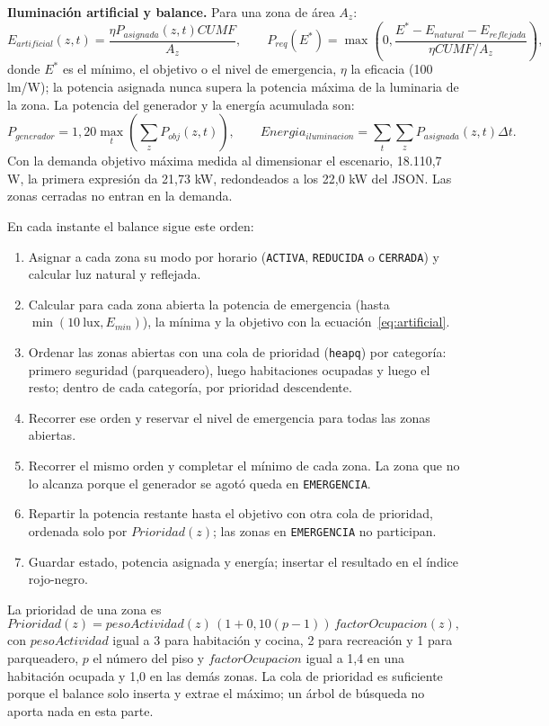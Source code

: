 \documentclass[12pt,a4paper]{article}
\newcommand{\estado}[1]{\texttt{#1}}
\newcommand{\codigo}[1]{\texttt{#1}}
\begin{document}
\textbf{Iluminación artificial y balance.} Para una zona de área $A_z$:
\begin{equation}
 E_{artificial}(z,t)=\frac{\eta P_{asignada}(z,t)CU MF}{A_z},\qquad
 P_{req}(E^*)=\max\left(0,\frac{E^*-E_{natural}-E_{reflejada}}{\eta CU MF/A_z}\right),
 \label{eq:artificial}
\end{equation}
donde $E^*$ es el mínimo, el objetivo o el nivel de emergencia, $\eta$ la eficacia (100 lm/W); la potencia asignada nunca supera la potencia máxima de la luminaria de la zona. La potencia del generador y la energía acumulada son:
\begin{equation}
 P_{generador}=1,20\max_t\left(\sum_zP_{obj}(z,t)\right),\qquad
 Energia_{iluminacion}=\sum_t\sum_zP_{asignada}(z,t)\Delta t.
 \label{eq:generador}
\end{equation}
Con la demanda objetivo máxima medida al dimensionar el escenario, 18.110,7 W, la primera expresión da 21,73 kW, redondeados a los 22,0 kW del JSON. Las zonas cerradas no entran en la demanda.

En cada instante el balance sigue este orden:
\begin{enumerate}
    \item Asignar a cada zona su modo por horario (\estado{ACTIVA}, \estado{REDUCIDA} o \estado{CERRADA}) y calcular luz natural y reflejada.
    \item Calcular para cada zona abierta la potencia de emergencia (hasta $\min(10\ \text{lux}, E_{min})$), la mínima y la objetivo con la ecuación~\ref{eq:artificial}.
    \item Ordenar las zonas abiertas con una cola de prioridad (\codigo{heapq}) por categoría: primero seguridad (parqueadero), luego habitaciones ocupadas y luego el resto; dentro de cada categoría, por prioridad descendente.
    \item Recorrer ese orden y reservar el nivel de emergencia para todas las zonas abiertas.
    \item Recorrer el mismo orden y completar el mínimo de cada zona. La zona que no lo alcanza porque el generador se agotó queda en \estado{EMERGENCIA}.
    \item Repartir la potencia restante hasta el objetivo con otra cola de prioridad, ordenada solo por $Prioridad(z)$; las zonas en \estado{EMERGENCIA} no participan.
    \item Guardar estado, potencia asignada y energía; insertar el resultado en el índice rojo-negro.
\end{enumerate}
La prioridad de una zona es
\begin{equation}
 Prioridad(z)=pesoActividad(z)\,(1+0,10(p-1))\,factorOcupacion(z),
 \label{eq:prioridad}
\end{equation}
con $pesoActividad$ igual a 3 para habitación y cocina, 2 para recreación y 1 para parqueadero, $p$ el número del piso y $factorOcupacion$ igual a 1,4 en una habitación ocupada y 1,0 en las demás zonas. La cola de prioridad es suficiente porque el balance solo inserta y extrae el máximo; un árbol de búsqueda no aporta nada en esta parte.
\end{document}
